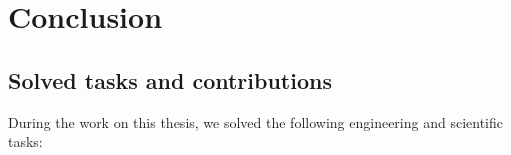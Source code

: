\chapter{Conclusion}
\label{ch:summary}


\section{Solved tasks and contributions}

During the work on this thesis, we solved the following engineering and scientific tasks:


